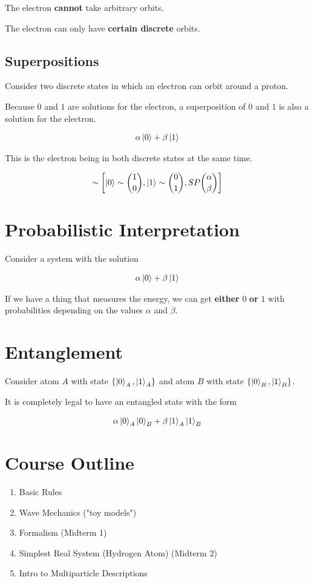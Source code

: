 \documentclass[fleqn]{report}
\newcommand{\equations} [1] {
\begin{gather*}
#1
\end{gather*}
}
\begin{document}
The electron \textbf{cannot} take arbitrary orbits.

The electron can only have \textbf{certain discrete} orbits.

\subsection{Superpositions}
Consider two discrete states in which an electron can orbit around a proton. 

Because $0$ and $1$ are solutions for the electron, a superposition of $0$ and $1$ is 
also a solution for the electron.

\equations{
    \alpha \ket 0 + \beta \ket 1
}

This is the electron being in both discrete states at the same time.

\equations{
    \sim
    \left[ 
        \ket 0 \sim {1 \choose 0}, 
        \ket 1 \sim {0 \choose 1}, 
        SP {\alpha \choose \beta}
    \right]
}

\section{Probabilistic Interpretation}
Consider a system with the solution 
\equations{
    \alpha \ket 0 + \beta \ket 1
}

If we have a thing that measures the energy, we can get 
\textbf{either} $0$ \textbf{or} $1$ with probabilities depending on the 
values $\alpha$ and $\beta$.

\section{Entanglement}
Consider atom $A$ with state $\{ \ket{0}_A, \ket{1}_A \}$
and atom $B$ with state $\{ \ket{0}_B, \ket{1}_B \}$.

It is completely legal to have an entangled state with the form 

\equations{
    \alpha \ket{0}_A \ket{0}_B 
    +
    \beta \ket{1}_A \ket{1}_B 
}


\section{Course Outline}
\begin{enumerate}
    \item 
    Basic Rules 
    \item 
    Wave Mechanics ("toy models")
    \item 
    Formalism (Midterm 1)
    \item 
    Simplest Real System (Hydrogen Atom) (Midterm 2)
    \item 
    Intro to Multiparticle Descriptions
\end{enumerate}
\end{document}
